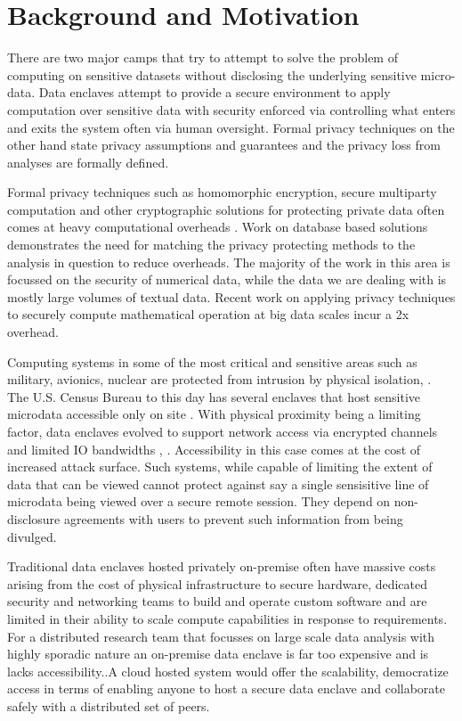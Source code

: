 \section{Background and Motivation} \label{sec:background}

There are two major camps that try to attempt to solve the problem of computing on sensitive
datasets without disclosing the underlying sensitive micro-data. Data enclaves attempt to
provide a secure environment to apply computation over sensitive data with security enforced
via controlling what enters and exits the system often via human oversight. Formal privacy
techniques on the other hand state privacy assumptions and guarantees and the privacy loss
from analyses are formally defined.

Formal privacy techniques such as homomorphic encryption, secure multiparty computation and
other cryptographic solutions for protecting private data often comes at heavy computational
overheads \cite{naehrig2011can}. Work on database based solutions \cite{popa2011cryptdb}
demonstrates the need for matching the privacy protecting methods to the analysis in question
to reduce overheads. The majority of the work in this area is focussed on the security of
numerical data, while the data we are dealing with is mostly large volumes of textual data.
Recent work \cite{kepner2014computing} on applying privacy techniques to securely compute
mathematical operation at big data scales incur a 2x overhead.

Computing systems in some of the most critical and sensitive areas such as military, avionics,
nuclear are protected from intrusion by physical isolation\cite{byres2013air}, \cite{ross2013security}.
The U.S. Census Bureau to this day has several enclaves that host sensitive microdata accessible
only on site \cite{rdc_uscensus}. With physical proximity being a limiting factor, data enclaves
evolved to support network access via encrypted channels and limited IO bandwidths \cite{lane2008using}, \cite{grossman2016toward}.
Accessibility in this case comes at the cost of increased attack surface. Such systems, while
capable of limiting the extent of data that can be viewed cannot protect against say a single
sensisitive line of microdata being viewed over a secure remote session. They depend on non-disclosure
agreements with users to prevent such information from being divulged.

Traditional data enclaves hosted privately on-premise often have massive costs arising
from the cost of physical infrastructure to secure hardware, dedicated security and networking
teams to build and operate custom software and are limited in their ability to scale
compute capabilities in response to requirements. For a distributed research team that
focusses on large scale data analysis with highly sporadic nature an on-premise data enclave
is far too expensive and is lacks accessibility..A cloud hosted system would offer the scalability,
democratize access in terms of enabling anyone to host a secure data enclave and collaborate safely with a
distributed set of peers.

